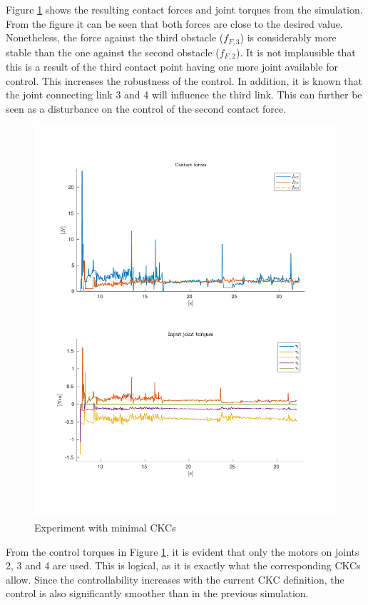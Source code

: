 Figure \ref{fig:2xf-miniJ} shows the resulting contact forces and joint torques from the simulation. From the figure it can be seen that both forces are close to the desired value. Nonetheless, the force against the third obstacle ($f_{F,3}$) is considerably more stable than the one against the second obstacle ($f_{F,2}$). It is not implausible that this is a result of the third contact point having one more joint available for control. This increases the robustness of the control. In addition, it is known that the joint connecting link 3 and 4 will influence the third link. This can further be seen as a disturbance on the control of the second contact force.

\begin{figure}
    \centering
    \includegraphics[trim=2cm 2cm 2cm 2cm, clip=true, width=\textwidth]{figures/experiments/2xf/miniJ-2plot.pdf}
    \caption{Experiment with minimal CKCs}
    \label{fig:2xf-miniJ}
\end{figure}

From the control torques in Figure \ref{fig:2xf-miniJ}, it is evident that only the motors on joints 2, 3 and 4 are used. This is logical, as it is exactly what the corresponding CKCs allow. Since the controllability increases with the current CKC definition, the control is also significantly smoother than in the previous simulation.




